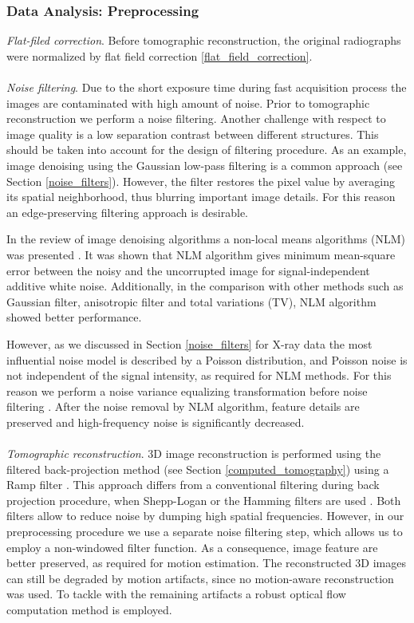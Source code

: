 \subsubsection{Data Analysis: Preprocessing}

\noindent \textit{Flat-filed correction}. Before tomographic reconstruction, the original radiographs were normalized by flat field correction \ref{flat_field_correction}. 
\\
\\
\textit{Noise filtering}. Due to the short exposure time during fast acquisition
process the images are contaminated with high amount of noise. Prior to tomographic reconstruction we perform a noise filtering. 
Another challenge with respect to image quality is a low separation contrast between different structures. This should be taken into account for the design of filtering procedure. As an example, image denoising using the Gaussian low-pass filtering is a common approach (see Section  \ref{noise_filters}). However, the filter restores the pixel value by averaging its
spatial neighborhood, thus blurring important image details. For this reason an edge-preserving filtering approach is desirable.

In the review of image denoising algorithms a non-local means algorithms (NLM) was presented \cite{Buades05}. It was shown that NLM algorithm gives minimum mean-square error between the noisy and the uncorrupted image for signal-independent additive white
noise. Additionally, in the comparison with other methods such as Gaussian filter, anisotropic filter and total variations (TV), NLM algorithm showed better performance.  

However, as we discussed in Section \ref{noise_filters} for X-ray data the most influential noise model is described by a Poisson distribution, and
Poisson noise is not independent of the signal intensity, as required for NLM methods.
For this reason we perform a noise variance
equalizing transformation  before noise filtering . After the noise removal by NLM algorithm, feature details are preserved and high-frequency noise is significantly decreased.
\\
\\
\textit{Tomographic reconstruction}. 3D image reconstruction is performed using the filtered back-projection method (see Section \ref{computed_tomography}) using a Ramp filter \cite{Buzug08}. This approach differs from a conventional filtering during back projection procedure, when Shepp-Logan or the Hamming filters are used \cite{Buzug08}. Both filters allow to reduce noise by dumping high spatial
frequencies. However, in our preprocessing procedure we use a separate noise filtering step, which allows us to employ a non-windowed
filter function. As a consequence, image feature are better preserved, as required for motion estimation.
The reconstructed 3D images can still be degraded by motion artifacts, since no motion-aware reconstruction was used. To tackle with the remaining artifacts a robust optical flow computation method is employed.



